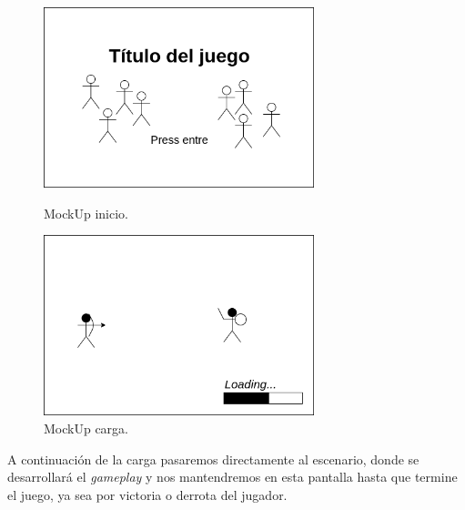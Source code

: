 \begin{figure}[h]
\centering
\begin{minipage}[c]{0.42\linewidth}
	\hspace{9mm}
	\includegraphics[width=0.7\textwidth]{imagenes/gdd/pantallas/Pantalla_ini.png}
	\caption{MockUp inicio.}
	\label{mockup_ini}
\end{minipage}
\begin{minipage}[c]{0.42\linewidth}
	\hspace{9mm}
	\includegraphics[width=0.7\textwidth]{imagenes/gdd/pantallas/Pantalla_carga.png}
	\caption{MockUp carga.}
	\label{mockup_carga}
\end{minipage}	
\end{figure}

A continuación de la carga pasaremos directamente al escenario, donde se desarrollará el
\textit{gameplay} y nos mantendremos en esta pantalla hasta que termine el juego, ya sea
por victoria o derrota del jugador.

